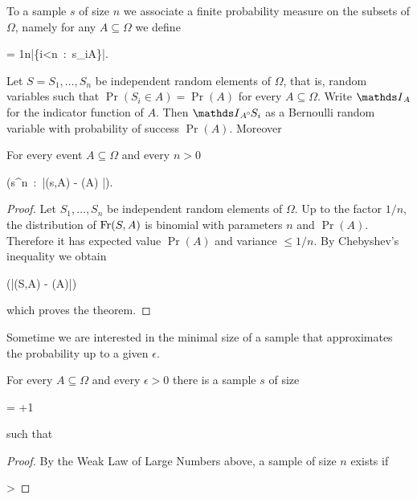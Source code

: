 \documentclass[scombinatorics.tex]{subfiles}
\begin{document}
To a sample $s$ of size $n$ we associate a finite probability measure on the subsets of $\Omega$, namely for any $A\subseteq\Omega$ we define 

{=}
{\frac1n\cdot \big|\big\{i<n\ :\ s_i\in A\big\}\big|.}

Let $S=S_1,\dots,S_n$ be independent random elements of $\Omega$, that is, random variables such that $\Pr(S_i\in A)=\Pr(A)$ for every $A\subseteq\Omega$.
Write $\Indicator_A$ for the indicator function of $A$. 
Then $\Indicator_A\smallcirc S_i$ as a Bernoulli random variable with probability of success $\Pr(A)$.
Moreover


\begin{void_thm}
  For every event $A\subseteq\Omega$ and every $n>0$
  
  {\ge}
  {\Pr \Big(s\in\Omega^n\ :\ \big|\Fr(s,A) - \Pr(A)  \big|\ge\epsilon\Big).}
\end{void_thm}


\begin{proof}
  Let $S_1,\dots,S_n$ be independent random elements of $\Omega$.
  Up to the factor $1/n$, the distribution of $\mathop{\rm Fr}(S,A)$ is binomial with parameters $n$ and $\Pr(A)$.
  Therefore it has expected value $\Pr(A)$ and  variance $\le1/n$. 
  By Chebyshev's inequality we obtain 
  
  {\ge}
  {\Pr\Big(\big|\Fr(S,A) - \Pr(A)\big|\ge\epsilon\Big)}

  which proves the theorem.
\end{proof}

Sometime we are interested in the minimal size of a sample that approximates the probability up to a given $\epsilon$.

\begin{corollary}\label{corl_wlln}
  For every $A\subseteq\Omega$ and every $\epsilon>0$ there is a sample $s$ of size

      {=}
      {\left\lfloor{}+1\right\rfloor} 
      
  such that

\end{corollary}


\begin{proof}
  By the Weak Law of Large Numbers above, a sample of size $n$ exists if

      {>}
      {}
\end{proof}
\end{document}
